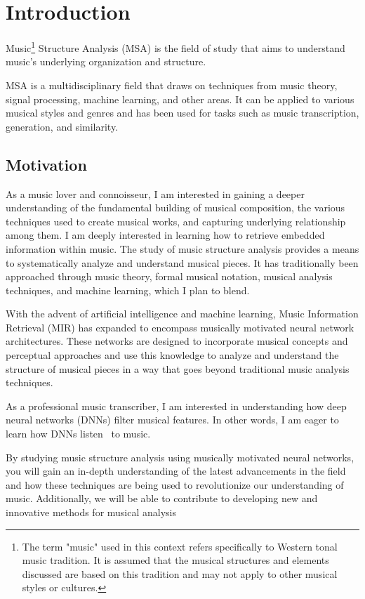 \normallinespacing

\chapter{Introduction}

Music\footnote{The term "music" used in this context refers specifically to Western tonal music tradition. It is assumed that the musical structures and elements discussed are based on this tradition and may not apply to other musical styles or cultures.} Structure Analysis (MSA) is the field of study that aims to understand music's underlying organization and structure.

MSA is a multidisciplinary field that draws on techniques from music theory, signal processing, machine learning, and other areas. It can be applied to various musical styles and genres and has been used for tasks such as music transcription, generation, and similarity. 

\section{Motivation}

As a music lover and connoisseur, I am interested in gaining a deeper understanding of the fundamental building of musical composition, the various techniques used to create musical works, and capturing underlying relationship among them. I am deeply interested in learning how to retrieve embedded information within music. The study of music structure analysis provides a means to systematically analyze and understand musical pieces. It has traditionally been approached through music theory, formal musical notation, musical analysis techniques, and machine learning, which I plan to blend.

With the advent of artificial intelligence and machine learning, Music Information Retrieval (MIR) has expanded to encompass musically motivated neural network architectures. These networks are designed to incorporate musical concepts and perceptual approaches and use this knowledge to analyze and understand the structure of musical pieces in a way that goes beyond traditional music analysis techniques.

As a professional music transcriber, I am interested in understanding how deep neural networks (DNNs) filter musical features. In other words, I am eager to learn how DNNs listen~\cite{7500246} to music.

By studying music structure analysis using musically motivated neural networks, you will gain an in-depth understanding of the latest advancements in the field and how these techniques are being used to revolutionize our understanding of music. Additionally, we will be able to contribute to developing new and innovative methods for musical analysis~\cite{Huang2019MusicTG}


